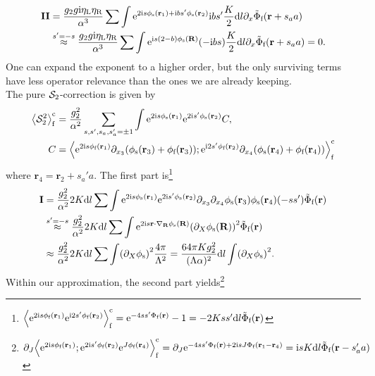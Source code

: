 \begin{align*}
\textbf{II} &= \frac{g_2g \i\eta_\L\eta_\R}{\alpha^3} \sum \int \powe{2\i s\phi_\s(\textbf{r}_1) + \i bs' \phi_\s(\textbf{r}_2)} \i bs' \frac{K}{2} \d l \partial_{x} \tilde{\Phi}_\f(\textbf{r} + s_aa)\\
&\overset{s'=-s}{\approx} \frac{g_2g \i\eta_\L\eta_\R}{\alpha^3} \sum \int \powe{\i s (2-b) \phi_\s(\textbf{R})} (-\i bs) \frac{K}{2} \d l \partial_{x} \tilde{\Phi}_\f(\textbf{r} + s_aa) = 0.
\end{align*}
One can expand the exponent to a higher order, but the only surviving terms have less operator relevance than the ones we are already keeping.\\
The pure $\sact_2$-correction is given by
\begin{align*}
\bra*{\sact_2^2}_\f^\c &= \frac{g_2^2}{\alpha^2} \sum_{s,s',s_a,s_a'=\pm 1} \int \powe{2\i s\phi_\s(\textbf{r}_1)} \powe{2\i s' \phi_\s(\textbf{r}_2)} C,\\
C &= \bra*{\powe{2\i s\phi_\f(\textbf{r}_1)} \partial_{x_3} \kla*{\phi_\s(\textbf{r}_3) + \phi_\f(\textbf{r}_3)} ;\powe{\i 2s' \phi_\f(\textbf{r}_2)} \partial_{x_4} \kla*{\phi_\s(\textbf{r}_4) + \phi_\f(\textbf{r}_4)}}_\f^\c
\end{align*}
where $\textbf{r}_4=\textbf{r}_2 + s_a'a$.
The first part is\footnote{$\bra*{\powe{2\i s\phi_\f(\textbf{r}_1)} \powe{\i 2s' \phi_\f(\textbf{r}_2)} }_\f^\c = \powe{-4ss' \Phi_\f(\textbf{r})} - 1 = -2Kss' \d l \tilde{\Phi}_\f(\textbf{r})$}
\begin{align*}
\textbf{I} &= \frac{g_2^2}{\alpha^2} 2K\d l \sum \int \powe{2\i s\phi_\s(\textbf{r}_1)} \powe{2\i s' \phi_\s(\textbf{r}_2)} \partial_{x_3} \partial_{x_4} \phi_\s(\textbf{r}_3) \phi_\s(\textbf{r}_4) (-ss') \tilde{\Phi}_\f(\textbf{r})\\
&\overset{s'=-s}{\approx} \frac{g_2^2}{\alpha^2} 2K\d l \sum \int \powe{2\i s \textbf{r} \cdot \nabla_\textbf{R} \phi_\s(\textbf{R})} \kla*{\partial_{X} \phi_\s(\textbf{R})}^2 \tilde{\Phi}_\f(\textbf{r}) \\
&\approx \frac{g_2^2}{\alpha^2} 2K\d l \sum \int \kla*{\partial_{X} \phi_\s}^2 \frac{4\pi}{\Lambda^2} = \frac{64\pi K g_2^2}{(\Lambda\alpha)^2} \d l \int \kla*{\partial_{X} \phi_\s}^2.
\end{align*}
Within our approximation, the second part yields\footnote{$\partial_J \bra*{\powe{2\i s\phi_\f(\textbf{r}_1)}; \powe{2\i s' \phi_\f(\textbf{r}_2)} \powe{J\phi_\f(\textbf{r}_4)}}_\f^\c = \partial_J \powe{-4ss' \Phi_\f(\textbf{r}) + 2\i sJ\Phi_\f(\textbf{r}_1 - \textbf{r}_4)} = \i s K \d l \tilde{\Phi}_\f(\textbf{r} - s_a'a)$}
